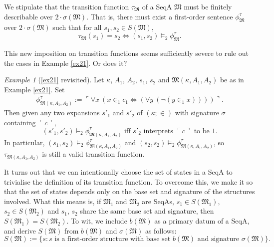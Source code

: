 \documentclass[12pt, twoside]{memoir}
\numberwithin{equation}{section}
\theoremstyle{definition}
\theoremstyle{remark}
\newtheorem{ex}[thm]{Example}
\theoremstyle{definition}
\theoremstyle{definition}
\theoremstyle{definition}
\theoremstyle{remark}
\begin{document}
We stipulate that the transition function $\tau_{\mathfrak{M}}$ of a SeqA $\mathfrak{M}$ must be finitely describable over $2 \cdot \sigma(\mathfrak{M})$. That is, there must exist a first-order sentence $\phi^{\tau}_{\mathfrak{M}}$ over $2 \cdot \sigma(\mathfrak{M})$ such that for all $s_1, s_2 \in S(\mathfrak{M})$, 
\begin{equation*}
    \tau_{\mathfrak{M}}(s_1) = s_2 \iff (s_1, s_2) \models_2 \phi^{\tau}_{\mathfrak{M}} \text{.}
\end{equation*}

This new imposition on transition functions seems sufficiently severe to rule out the cases in Example \ref{ex21}. Or does it?

\begin{ex}[\ref{ex21} revisited]
Let $\kappa$, $A_1$, $A_2$, $s_1$, $s_2$ and $\mathfrak{M}(\kappa, A_1, A_2)$ be as in Example \ref{ex21}. Set 
\begin{gather*}
    \phi^{\tau}_{\mathfrak{M}(\kappa, A_1, A_2)} := \ulcorner \forall x \ (x \in_1 c_1 \iff (\forall y \ (\neg (y \in_1 x)))) \urcorner \text{.}
\end{gather*}
Then given any two expansions $s'_1$ and $s'_2$ of $(\kappa; \in)$ with signature $\sigma$ containing $\ulcorner c \urcorner$, 
\begin{equation*}
    (s'_1, s'_2) \models_2 \phi^{\tau}_{\mathfrak{M}(\kappa, A_1, A_2)} \text{ iff } s'_2 \text{ interprets } \ulcorner c \urcorner \text{ to be } 1 \text{.}
\end{equation*}
In particular, $(s_1, s_2) \models_2 \phi^{\tau}_{\mathfrak{M}(\kappa, A_1, A_2)}$ and $(s_2, s_2) \models_2 \phi^{\tau}_{\mathfrak{M}(\kappa, A_1, A_2)}$, so $\tau_{\mathfrak{M}(\kappa, A_1, A_2)}$ is still a valid transition function. 
\end{ex}

It turns out that we can intentionally choose the set of states in a SeqA to trivialise the definition of its transition function. To overcome this, we make it so that the set of states depends only on the base set and signature of the structures involved. What this means is, if $\mathfrak{M}_1$ and $\mathfrak{M}_2$ are SeqAs, $s_1 \in S(\mathfrak{M}_1)$, $s_2 \in S(\mathfrak{M}_2)$ and $s_1$, $s_2$ share the same base set and signature, then $S(\mathfrak{M}_1) = S(\mathfrak{M}_2)$. To wit, we include $b(\mathfrak{M})$ as a primary datum of a SeqA, and derive $S(\mathfrak{M})$ from $b(\mathfrak{M})$ and $\sigma(\mathfrak{M})$ as follows: 
\begin{equation*}
    S(\mathfrak{M}) := \{s : s \text{ is a first-order structure with base set } b(\mathfrak{M}) \text{ and signature } \sigma(\mathfrak{M})\} \text{.}
\end{equation*}
\end{document}
